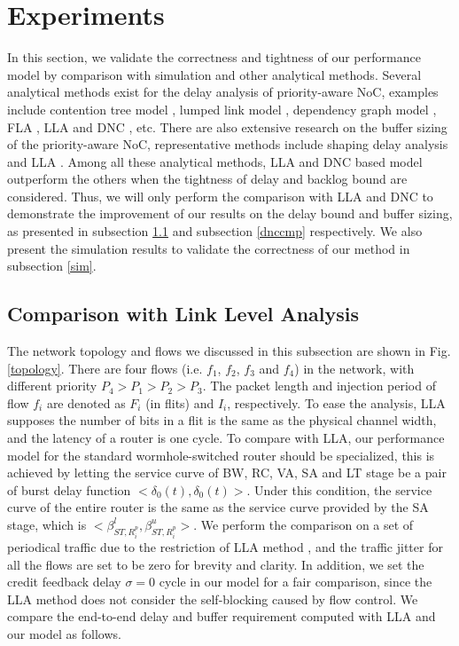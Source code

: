 \documentclass[preprint]{elsarticle}
\begin{document}
\section{Experiments}\label{experiments}
In this section, we validate the correctness and tightness of our performance model by comparison with simulation and other analytical methods. Several analytical methods exist for the delay analysis of priority-aware NoC, examples include contention tree model \cite{LuJS05}, lumped link model \cite{707545}, dependency graph model \cite{708526}, FLA \cite{Shi:2008:RCA:1397757.1397996}, LLA \cite{73} and DNC \cite{Qian489900}, etc. There are also extensive research on the buffer sizing of the priority-aware NoC, representative methods include shaping delay analysis \cite{Manolache:2006:BSO:1131481.1131683} and LLA \cite{189}. Among all these analytical methods, LLA \cite{73}\cite{189} and DNC \cite{Qian489900} based model outperform the others when the tightness of delay and backlog bound are considered. Thus, we will only perform the comparison with LLA and DNC to demonstrate the improvement of our results on the delay bound and buffer sizing, as presented in subsection \ref{llacmp} and subsection \ref{dnccmp} respectively. We also present the simulation results to validate the correctness of our method in subsection \ref{sim}.

\subsection{Comparison with Link Level Analysis}\label{llacmp}
The network topology and flows we discussed in this subsection are shown in Fig. \ref{topology}. There are four flows (i.e. $f_1$, $f_2$, $f_3$ and $f_4$) in the network, with different priority $P_4>P_1>P_2>P_3$. The packet length and injection period of flow $f_i$ are denoted as $F_i$ (in flits) and $I_i$, respectively. To ease the analysis, LLA supposes the number of bits in a flit is the same as the physical channel width, and the latency of a router is one cycle. To compare with LLA, our performance model for the standard wormhole-switched router should be specialized, this is achieved by letting the service curve of BW, RC, VA, SA and LT stage be a pair of burst delay function $<\delta_0(t),\delta_0(t)>$. Under this condition, the service curve of the entire router is the same as the service curve provided by the SA stage, which is $<\beta_{ST,R_i^p}^l,\beta_{ST,R_i^p}^u>$. We perform the comparison on a set of periodical traffic due to the restriction of LLA method \cite{73}\cite{189}, and the traffic jitter for all the flows are set to be zero for brevity and clarity. In addition, we set the credit feedback delay $\sigma=0$ cycle in our model for a fair comparison, since the LLA method does not consider the self-blocking caused by flow control. We compare the end-to-end delay and buffer requirement computed with LLA and our model as follows.
\end{document}
